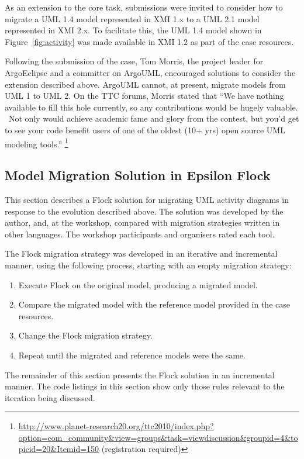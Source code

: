 As an extension to the core task, submissions were invited to consider how to migrate a UML 1.4 model represented in XMI 1.x to a UML 2.1 model represented in XMI 2.x. To facilitate this, the UML 1.4 model shown in Figure~\ref{fig:activity} was made available in XMI 1.2 as part of the case resources.

Following the submission of the case, Tom Morris, the project leader for ArgoEclipse and a committer on ArgoUML, encouraged solutions to consider the extension described above. ArgoUML cannot, at present, migrate models from UML 1 to UML 2.  On the TTC forums, Morris stated that ``We have nothing available to fill this hole currently, so any contributions would be hugely valuable.  Not only would achieve academic fame and glory from the contest, but you'd get to see your code benefit users of one of the oldest (10+ yrs) open source UML modeling tools.'' \footnote{\url{http://www.planet-research20.org/ttc2010/index.php?option=com_community&view=groups&task=viewdiscussion&groupid=4&topicid=20&Itemid=150} (registration required)}

\subsection{Model Migration Solution in Epsilon Flock}
\label{subsec:ttc_solution}
This section describes a Flock solution for migrating UML activity diagrams in response to the evolution described above. The solution was developed by the author, and, at the workshop, compared with migration strategies written in other languages. The workshop participants and organisers rated each tool.

The Flock migration strategy was developed in an iterative and incremental manner, using the following process, starting with an empty migration strategy:

\begin{enumerate}
	\item Execute Flock on the original model, producing a migrated model.
	\item Compare the migrated model with the reference model provided in the case resources.
	\item Change the Flock migration strategy.
	\item Repeat until the migrated and reference models were the same.
\end{enumerate}

The remainder of this section presents the Flock solution in an incremental manner. The code listings in this section show only those rules relevant to the iteration being discussed.

